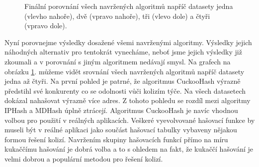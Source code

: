 \begin{figure}[!ht]
	\caption{Finální porovnání všech navržených algoritmů napříč datasety jedna (vlevho nahoře), dvě (vpravo nahoře), tři (vlevo dole) a čtyři (vpravo dole).}
	\label{fig:conclusion_boxplot_2}
\end{figure}

Nyní porovnejme výsledky dosažené všemi navrženými algoritmy. Výsledky jejich náhodných alternativ pro tentokrát vynecháme, neboť jsme jejich výsledky již
zkoumali a v porovnání s jiným algoritmem nedávají smysl. Na grafech na obrázku \ref{fig:conclusion_boxplot_2}. můžeme vidět srovnání všech navržených 
algoritmů napříč datasety jedna až čtyři. Na první pohled je patrné, že algoritmus CuckooHash výrazně předstihl své konkurenty co se odolnosti vůči kolizím 
týče. Na všech datasetech dokázal nahašovat výrazně více adres. Z tohoto pohledu se rozdíl mezi algoritmy IPHash a MDHash úplně ztrácejí. Algoritmus
CuckooHash je navíc vhodnou volbou pro použití v reálných aplikacích. Veškeré vyevolvované hašovací funkce by museli být v reálné aplikaci jako součást
hašovací tabulky vybaveny nějakou formou řešení kolizí. Navržením skupiny hašovacích funkcí přímo na míru kukaččímu hašování je dobrá volba a to s ohledem
na fakt, že kukaččí hašování je velmi dobrou a populární metodou pro řešení kolizí.

